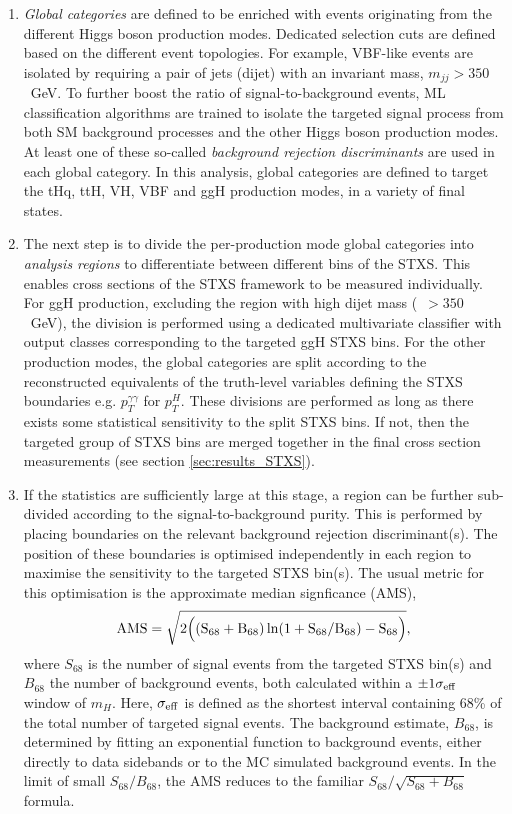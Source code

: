 \begin{enumerate}
    \item \textit{Global categories} are defined to be enriched with events originating from the different Higgs boson production modes. Dedicated selection cuts are defined based on the different event topologies. For example, VBF-like events are isolated by requiring a pair of jets (dijet) with an invariant mass, $m_{jj}>350$~GeV. To further boost the ratio of signal-to-background events, ML classification algorithms are trained to isolate the targeted signal process from both SM background processes and the other Higgs boson production modes. At least one of these so-called \textit{background rejection discriminants} are used in each global category. In this analysis, global categories are defined to target the tHq, ttH, VH, VBF and ggH production modes, in a variety of final states.
    
    \item The next step is to divide the per-production mode global categories into \textit{analysis regions} to differentiate between different bins of the STXS. This enables cross sections of the STXS framework to be measured individually. For ggH production, excluding the region with high dijet mass (\mjj~$>350$~GeV), the division is performed using a dedicated multivariate classifier with output classes corresponding to the targeted ggH STXS bins. For the other production modes, the global categories are split according to the reconstructed equivalents of the truth-level variables defining the STXS boundaries e.g. $p_T^{\gamma\gamma}$ for $p_T^H$. These divisions are performed as long as there exists some statistical sensitivity to the split STXS bins. If not, then the targeted group of STXS bins are merged together in the final cross section measurements (see section \ref{sec:results_STXS}). 
    
    \item If the statistics are sufficiently large at this stage, a region can be further sub-divided according to the signal-to-background purity. This is performed by placing boundaries on the relevant background rejection discriminant(s). The position of these boundaries is optimised independently in each region to maximise the sensitivity to the targeted STXS bin(s). The usual metric for this optimisation is the approximate median signficance (AMS),
    \begin{equation}
        \rm{AMS} = \sqrt{2\Big((S_{68}+B_{68})\ln(1+S_{68}/B_{68})-S_{68}\Big)},
    \end{equation}
    \noindent
    where $S_{68}$ is the number of signal events from the targeted STXS bin(s) and $B_{68}$ the number of background events, both calculated within a $\pm1\sigma_{\rm{eff}}$ window of $m_H$. Here, $\sigma_{\rm{eff}}$ is defined as the shortest interval containing 68\% of the total number of targeted signal events. The background estimate, $B_{68}$, is determined by fitting an exponential function to background events, either directly to data sidebands or to the MC simulated background events. In the limit of small $S_{68}/B_{68}$, the AMS reduces to the familiar $S_{68}/\sqrt{S_{68}+B_{68}}$ formula.
    

\end{enumerate}
